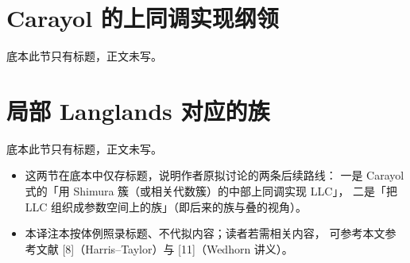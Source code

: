 \section{Carayol 的上同调实现纲领}

底本此节只有标题，正文未写。

\section{局部 Langlands 对应的族}

底本此节只有标题，正文未写。

\begin{keytakeaways}
\begin{itemize}[leftmargin=1.5em]
\item 这两节在底本中仅存标题，说明作者原拟讨论的两条后续路线：
      一是 Carayol 式的「用 Shimura 簇（或相关代数簇）的中部上同调实现 LLC」，
      二是「把 LLC 组织成参数空间上的族」（即后来的族与叠的视角）。
\item 本译注本按体例照录标题、不代拟内容；读者若需相关内容，
      可参考本文参考文献 [8]（Harris--Taylor）与 [11]（Wedhorn 讲义）。
\end{itemize}
\end{keytakeaways}
